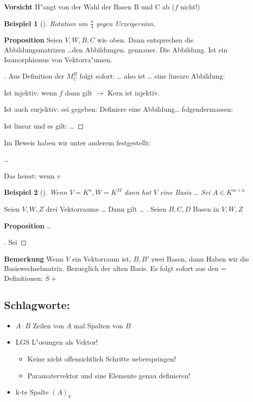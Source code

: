 \documentclass[11pt]{article}
\newtheorem{exa}{Beispiel}[section]
\begin{document}
\textbf{Vorsicht} H"angt von der Wahl der Basen B und C ab (\(f\) nicht!)

\begin{exa}[] \label{}
Rotation um \(\frac{\pi}{4}\) gegen Urzeigersinn.
\end{exa}

\textbf{Proposition} Seien \(V,W,B,C\) wie oben. Dann entsprechen die Abbildungsmatrizen
 \ldots{}den Abbildungen.  gennauer. Die Abbildung. Ist ein Isomorphismus von
 Vektorra"umen.

\begin{proof}[] \label{}
Aus Definition der \(M_C^B\) folgt sofort: \ldots{} also ist \ldots{} eine lineare
Abbildung:

Ist injektiv: wenn \(f\) dann gilt \(\rightarrow\) Kern ist injektiv.

Ist auch surjektiv: sei gegeben: Definiere eine Abbildung\ldots{} folgendermassen:

Ist linear und es gilt: \ldots{}
\end{proof}

Im Beweis haben wir unter anderem festgestellt:
\begin{relation}
\ldots{}

Das heisst: wenn \(v\)
\end{relation}

\begin{exa}[] \label{}
Wenn \(V=K^n, W=K^M\) dann hat \(V\) eine Basis \ldots{} Sei \(A\in K^{m\times n }\) 
\end{exa}

Seien \(V, W, Z\) drei Vektorraume \ldots{} Dann gilt \ldots{} . Seien \(B,C,D\) Basen in
\(V,W,Z\)

\textbf{Proposition} \ldots{}
\begin{proof}[] \label{}
Sei 
\end{proof}

\textbf{Bemerkung} Wenn \(V\) ein Vektorraum ist, \(B,B'\) zwei Basen, dann Haben wir die
 Basiswechselmatrix. Bezueglich der alten Basis. Es folgt sofort aus den
= Definitionen: \(S+\)
\subsection{Schlagworte:}
\label{sec:orgcf8c685}
\begin{itemize}
\item \(A\cdot B\) Zeilen von \(A\) mal Spalten von \(B\)
\item LGS L"osungen als Vektor!
\begin{itemize}
\item Keine nicht offensichtlich Schritte ueberspringen!
\item Paramatervektor und sine Elemente genau definieren!
\end{itemize}
\item k-te Spalte \((A)_k\)
\end{itemize}
\end{document}
